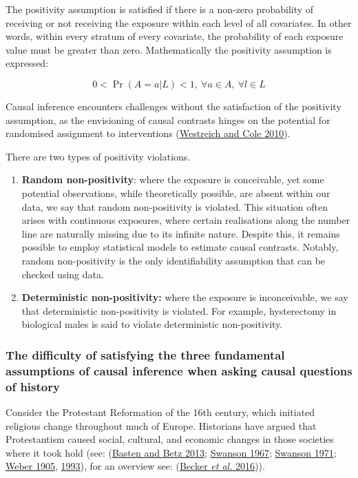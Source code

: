 \documentclass[
  singlecolumn]{article}
\begin{document}
The positivity assumption is satisfied if there is a non-zero
probability of receiving or not receiving the exposure within each level
of all covariates. In other words, within every stratum of every
covariate, the probability of each exposure value must be greater than
zero. Mathematically the positivity assumption is expressed:

\[
0 < \Pr(A=a|L)<1, ~ \forall a \in A, ~ \forall l \in L
\]

Causal inference encounters challenges without the satisfaction of the
positivity assumption, as the envisioning of causal contrasts hinges on
the potential for randomised assignment to interventions
(\protect\hyperlink{ref-westreich2010}{Westreich and Cole 2010}).

There are two types of positivity violations.

\begin{enumerate}
\def\labelenumi{\arabic{enumi}.}
\item
  \textbf{Random non-positivity}: where the exposure is conceivable, yet
  some potential observations, while theoretically possible, are absent
  within our data, we say that random non-positivity is violated. This
  situation often arises with continuous exposures, where certain
  realisations along the number line are naturally missing due to its
  infinite nature. Despite this, it remains possible to employ
  statistical models to estimate causal contrasts. Notably, random
  non-positivity is the only identifiability assumption that can be
  checked using data.
\item
  \textbf{Deterministic non-positivity:} where the exposure is
  inconceivable, we say that deterministic non-positivity is violated.
  For example, hysterectomy in biological males is said to violate
  deterministic non-positivity.
\end{enumerate}

\hypertarget{the-difficulty-of-satisfying-the-three-fundamental-assumptions-of-causal-inference-when-asking-causal-questions-of-history}{%
\subsubsection{The difficulty of satisfying the three fundamental
assumptions of causal inference when asking causal questions of
history}\label{the-difficulty-of-satisfying-the-three-fundamental-assumptions-of-causal-inference-when-asking-causal-questions-of-history}}

Consider the Protestant Reformation of the 16th century, which initiated
religious change throughout much of Europe. Historians have argued that
Protestantism caused social, cultural, and economic changes in those
societies where it took hold (see:
(\protect\hyperlink{ref-basten2013}{Basten and Betz 2013};
\protect\hyperlink{ref-swanson1967}{Swanson 1967};
\protect\hyperlink{ref-swanson1971}{Swanson 1971};
\protect\hyperlink{ref-weber1905}{Weber 1905},
\protect\hyperlink{ref-weber1993}{1993}), for an overview see:
(\protect\hyperlink{ref-becker2016}{Becker \emph{et al.} 2016})).
\end{document}
